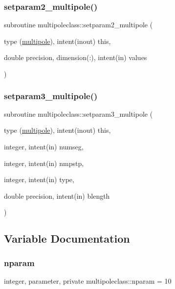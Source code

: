 \mbox{\label{namespacemultipoleclass_ac9e1b3b044ae69816a92317bcfd1bc05}} 
\subsubsection{\texorpdfstring{setparam2\_multipole()}{setparam2\_multipole()}}
{\footnotesize\ttfamily subroutine multipoleclass\+::setparam2\+\_\+multipole (\begin{DoxyParamCaption}\item[{type (\mbox{\hyperlink{namespacemultipoleclass_structmultipoleclass_1_1multipole}{multipole}}), intent(inout)}]{this,  }\item[{double precision, dimension(\+:), intent(in)}]{values }\end{DoxyParamCaption})}

\mbox{\label{namespacemultipoleclass_ad752ec84fa7145abc1b9130eb8654867}} 
\subsubsection{\texorpdfstring{setparam3\_multipole()}{setparam3\_multipole()}}
{\footnotesize\ttfamily subroutine multipoleclass\+::setparam3\+\_\+multipole (\begin{DoxyParamCaption}\item[{type (\mbox{\hyperlink{namespacemultipoleclass_structmultipoleclass_1_1multipole}{multipole}}), intent(inout)}]{this,  }\item[{integer, intent(in)}]{numseg,  }\item[{integer, intent(in)}]{nmpstp,  }\item[{integer, intent(in)}]{type,  }\item[{double precision, intent(in)}]{blength }\end{DoxyParamCaption})}



\subsection{Variable Documentation}
\mbox{\label{namespacemultipoleclass_a67bb1a71461cf39cdd365adab7fec8b9}} 
\subsubsection{\texorpdfstring{nparam}{nparam}}
{\footnotesize\ttfamily integer, parameter, private multipoleclass\+::nparam = 10\hspace{0.3cm}{\ttfamily [private]}}

